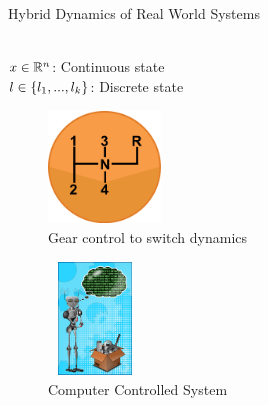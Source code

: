 \begin{frame}{Hybrid Dynamics of Real World Systems}
\begin{minipage}{0.45\textwidth}
\begin{tikzpicture}[scale =0.8,
location/.style = {circle, draw=red!60, thick, fill = cyan!5}, 
]
\end{tikzpicture}\\[0.5em]
%
$x\in\reals^n$: Continuous state\\
$l\in\set{l_1,...,l_k}$: Discrete state
\end{minipage}

\begin{minipage}{0.45\textwidth}
\begin{figure}
\center
\includegraphics[width = 3cm, height = 3cm]{figures/downloaded/CarGear.png}
\caption{\small Gear control to switch dynamics}
\end{figure}
\end{minipage}
%
\begin{minipage}{0.45\textwidth}
\begin{figure}
\includegraphics[height = 3cm, width = 2.5cm]{figures/downloaded/ComputerControl.jpg}
\caption{\small Computer Controlled System}
\end{figure}
\end{minipage}

\end{frame}



